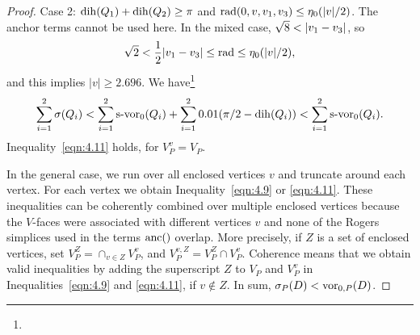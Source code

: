 \begin{proof}
\noindent Case 2:  $\operatorname{dih}(Q_1)+\operatorname{dih}(Q_2)\ge\pi$ and
    $\operatorname{rad}(0,v,v_1,v_3)\le \eta_0(|v|/2)$.
The anchor terms cannot be used here. In the mixed case,
$\sqr8<|v_1-v_3|$, so
$$\sqrt2<{\frac{1}{2}}|v_1-v_3|\le\operatorname{rad} \le \eta_0(|v|/2),$$
and this implies $|v|\ge 2.696$. We
have\footnote{}
$$\sum_{i=1}^2 \sigma(Q_i) < \sum_{i=1}^2 \operatorname{s-vor}_0(Q_i) +
\sum_{i=1}^2 0.01(\pi/2-\operatorname{dih}(Q_i))< \sum_{i=1}^2 \operatorname{s-vor}_0(Q_i).$$
Inequality~\ref{eqn:4.11} holds, for $V_P^v=V_P$.

In the general case, we run over all enclosed vertices $v$ and
truncate around each vertex.  For each vertex we obtain
Inequality~\ref{eqn:4.9} or \ref{eqn:4.11}. These inequalities can
be coherently combined over multiple enclosed vertices because the
$V$-faces were associated with different vertices $v$ and none of
the Rogers simplices used in the terms $\operatorname{anc}()$ overlap. More
precisely, if $Z$ is a set of enclosed vertices, set $V_P^Z =
\cap_{v\in Z} V_P^v$, and $V_P^{v,Z} = V_P^Z\cap V_P^v$. Coherence
means that we obtain valid inequalities by adding the superscript
$Z$ to $V_P$ and $V_P^v$ in Inequalities~\ref{eqn:4.9} and
\ref{eqn:4.11}, if $v\not\in Z$. In sum,
    $\sigma_P(D) < \operatorname{vor}_{0,P}(D)$.
%
\end{proof}
